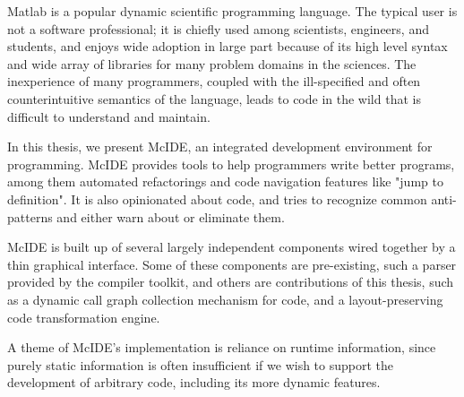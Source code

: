 {\sc Matlab}\textsuperscript{\textregistered} is a popular dynamic scientific
programming language. The typical \matlab user is not a software professional;
it is chiefly used among scientists, engineers, and students, and enjoys wide
adoption in large part because of its high level syntax and wide array of
libraries for many problem domains in the sciences. The inexperience of many
\matlab programmers, coupled with the ill-specified and often counterintuitive
semantics of the language, leads to \matlab code in the wild that is difficult
to understand and maintain.

In this thesis, we present McIDE, an integrated development environment for
\matlab programming. McIDE provides tools to help \matlab programmers write
better programs, among them automated refactorings and code navigation features
like "jump to definition". It is also opinionated about \matlab code, and tries
to recognize common anti-patterns and either warn about or eliminate them.

McIDE is built up of several largely independent components wired together by a
thin graphical interface. Some of these components are pre-existing, such a
\matlab parser provided by the \mclab compiler toolkit, and others are
contributions of this thesis, such as a dynamic call graph collection mechanism
for \matlab code, and a layout-preserving code transformation engine.

A theme of McIDE's implementation is reliance on runtime information, since
purely static information is often insufficient if we wish to support the
development of arbitrary \matlab code, including its more dynamic features.
